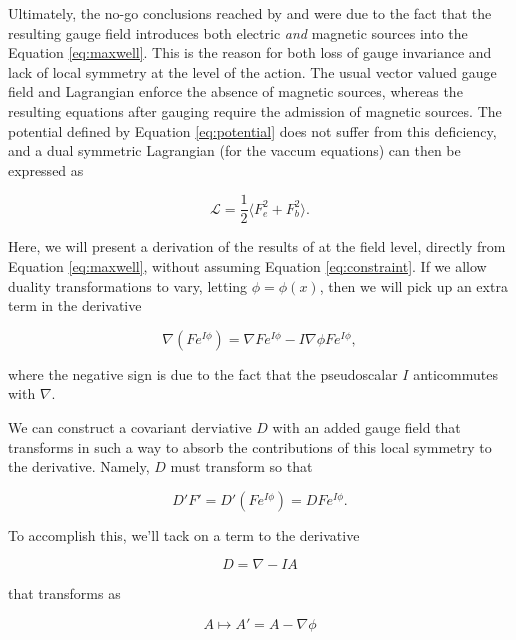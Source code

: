 \documentclass{article}
\begin{document}
  Ultimately, the no-go conclusions reached by \cite{bunster} and \cite{deser} were due to the fact that the resulting gauge field introduces both electric \emph{and} magnetic sources into the Equation \ref{eq:maxwell}. This is the reason for both loss of gauge invariance and lack of local symmetry at the level of the action. The usual vector valued gauge field and Lagrangian enforce the absence of magnetic sources, whereas the resulting equations after gauging require the admission of magnetic sources. The potential defined by Equation \ref{eq:potential} does not suffer from this deficiency, and a dual symmetric Lagrangian (for the vaccum equations) can then be expressed as\cite{dressel}

  \begin{equation}
    \mathcal{L} = \frac{1}{2}\langle F_e^2 + F_b^2 \rangle.
  \end{equation}

  Here, we will present a derivation of the results of \cite{tiwari} at the field level, directly from Equation \ref{eq:maxwell}, without assuming Equation \ref{eq:constraint}. If we allow duality transformations to vary, letting $\phi = \phi(x)$, then we will pick up an extra term in the derivative

  \begin{equation}
    \nabla (F e^{I \phi}) = \nabla F e^{I \phi} - I \nabla \phi F e^{I\phi},
  \end{equation}

  where the negative sign is due to the fact that the pseudoscalar $I$ anticommutes with $\nabla$.

  We can construct a covariant derviative $D$ with an added gauge field that transforms in such a way to absorb the contributions of this local symmetry to the derivative. Namely, $D$ must transform so that

  \begin{equation}
    D' F' = D' (F e^{I \phi}) = D F e^{I \phi}. \label{eq:covariant}
  \end{equation}

  To accomplish this, we'll tack on a term to the derivative

  \begin{equation}
    D = \nabla - I A
  \end{equation}

  that transforms as

  \begin{equation}
    A \mapsto A' = A - \nabla \phi\label{eq:gaugefreedom}
  \end{equation}
\end{document}
